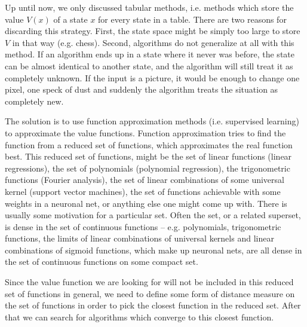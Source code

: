 Up until now, we only discussed tabular methods, i.e. methods which store the value \(V(x)\) of a state \(x\) for every state in a table. There are two reasons for discarding this strategy. First, the state space might be simply too large to store \(V\) in that way (e.g. chess). Second, algorithms do not generalize at all with this method. If an algorithm ends up in a state where it never was before, the state can be almost identical to another state, and the algorithm will still treat it as completely unknown. If the input is a picture, it would be enough to change one pixel, one speck of dust and suddenly the algorithm treats the situation as completely new.

The solution is to use function approximation methods (i.e. supervised learning) to approximate the value functions. Function approximation tries to find the function from a reduced set of functions, which approximates the real function best. This reduced set of functions, might be the set of linear functions (linear regressions), the set of polynomials (polynomial regression), the trigonometric functions (Fourier analysis), the set of linear combinations of some universal kernel (support vector machines), the set of functions achievable with some weights in a neuronal net, or anything else one might come up with. There is usually some motivation for a particular set. Often the set, or a related superset, is dense in the set of continuous functions -- e.g. polynomials, trigonometric functions, the limits of linear combinations of universal kernels and linear combinations of sigmoid functions, which make up neuronal nets, are all dense in the set of continuous functions on some compact set.

Since the value function we are looking for will not be included in this reduced set of functions in general, we need to define some form of distance measure on the set of functions in order to pick the closest function in the reduced set. After that we can search for algorithms which converge to this closest function.

